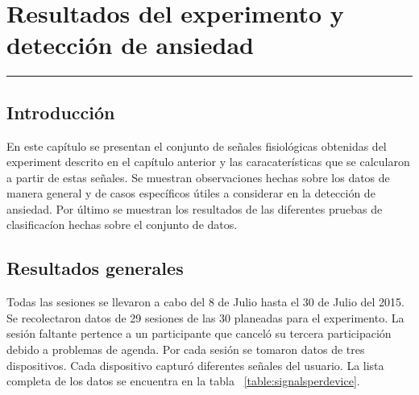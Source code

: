 
\chapter{Resultados del experimento y detecci\'on de ansiedad}\label{capit:cap4}
\vspace{-2.0325ex}%
\noindent
\rule{\textwidth}{0.5pt}
\vspace{-5.5ex}%
\newcommand{\pushline}{\Indp}%

\section{Introducci\'on}\label{cap4:intro}
En este cap\'itulo se presentan el conjunto de se\~nales fisiol\'ogicas obtenidas del experiment descrito en el cap\'itulo anterior y las caracater\'isticas que se calcularon a partir de estas se\~nales. Se muestran observaciones hechas sobre los datos de manera general y de casos espec\'ificos \'utiles a considerar en la detecci\'on de ansiedad. Por \'ultimo se muestran los resultados de las diferentes pruebas de clasificac\'ion hechas sobre el conjunto de datos.

\section{Resultados generales}
Todas las sesiones se llevaron a cabo del 8 de Julio hasta el 30 de Julio del 2015. Se recolectaron datos de 29 sesiones de las 30 planeadas para el experimento. La sesi\'on faltante pertence a un participante que cancel\'o su tercera participaci\'on debido a problemas de agenda. Por cada sesi\'on se tomaron datos de tres dispositivos. Cada dispositivo captur\'o diferentes se\~nales del usuario. La lista completa de los datos se encuentra en la tabla ~\ref{table:signalsperdevice}.

